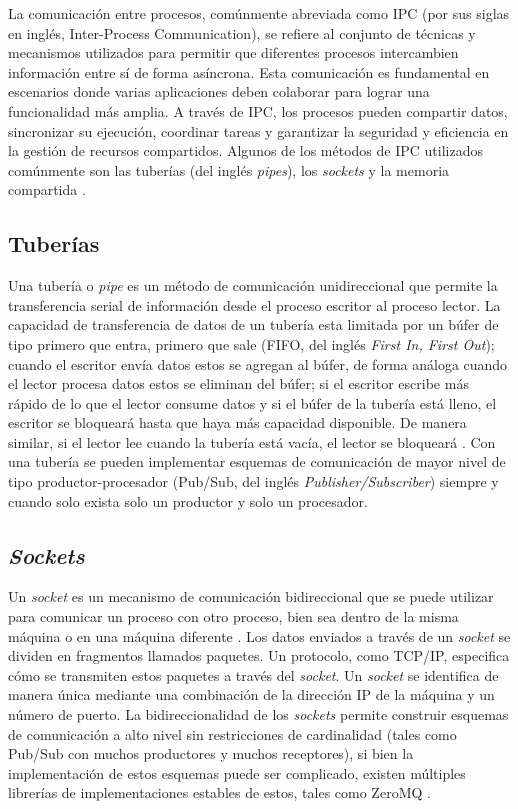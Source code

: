 La comunicación entre procesos, comúnmente abreviada como IPC (por sus siglas en inglés, Inter-Process Communication), se refiere al conjunto de técnicas y mecanismos utilizados para permitir que diferentes procesos intercambien información entre sí de forma asíncrona. Esta comunicación es fundamental en escenarios donde varias aplicaciones deben colaborar para lograr una funcionalidad más amplia. A través de IPC, los procesos pueden compartir datos, sincronizar su ejecución, coordinar tareas y garantizar la seguridad y eficiencia en la gestión de recursos compartidos. Algunos de los métodos de IPC utilizados comúnmente son las tuberías (del inglés \textit{pipes}), los \textit{sockets} y la memoria compartida \cite{IPCEval2015}.

\subsection*{Tuberías}

Una tubería o \textit{pipe} es un método de comunicación unidireccional que permite la transferencia serial de información desde el proceso escritor al proceso lector. La capacidad de transferencia de datos de un tubería esta limitada por un búfer de tipo primero que entra, primero que sale (FIFO, del inglés \textit{First In, First Out}); cuando el escritor envía datos estos se agregan al búfer, de forma análoga cuando el lector procesa datos estos se eliminan del búfer; si el escritor escribe más rápido de lo que el lector consume datos y si el búfer de la tubería está lleno, el escritor se bloqueará hasta que haya más capacidad disponible. De manera similar, si el lector lee cuando la tubería está vacía, el lector se bloqueará \cite{IPCEval2015}. Con una tubería se pueden implementar esquemas de comunicación de mayor nivel de tipo productor-procesador (Pub/Sub, del inglés \textit{Publisher/Subscriber}) siempre y cuando solo exista solo un productor y solo un procesador.

\subsection*{\textit{Sockets}}

Un \textit{socket} es un mecanismo de comunicación bidireccional que se puede utilizar para comunicar un proceso con otro proceso, bien sea dentro de la misma máquina o en una máquina diferente \cite{IPCEval2015}. Los datos enviados a través de un \textit{socket} se dividen en fragmentos llamados paquetes. Un protocolo, como TCP/IP, especifica cómo se transmiten estos paquetes a través del \textit{socket}. Un \textit{socket} se identifica de manera única mediante una combinación de la dirección IP de la máquina y un número de puerto. La bidireccionalidad de los \textit{sockets} permite construir esquemas de comunicación a alto nivel sin restricciones de cardinalidad (tales como Pub/Sub con muchos productores y muchos receptores), si bien la implementación de estos esquemas puede ser complicado,  existen múltiples librerías de implementaciones estables de estos, tales como ZeroMQ \cite{zeroMQ}.

